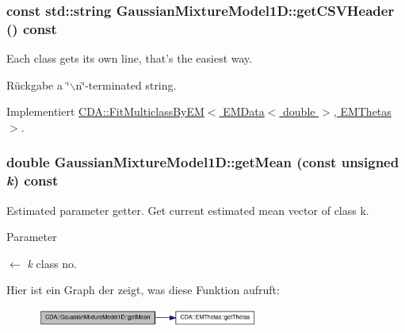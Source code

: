 \hypertarget{classCDA_1_1GaussianMixtureModel1D_adfb929641e967030e9b63c6e53ea64c0}{
\subsubsection[{getCSVHeader}]{\setlength{\rightskip}{0pt plus 5cm}const std::string GaussianMixtureModel1D::getCSVHeader () const}}
\label{classCDA_1_1GaussianMixtureModel1D_adfb929641e967030e9b63c6e53ea64c0}


Each class gets its own line, that's the easiest way. 

\begin{DoxyReturn}{Rückgabe}
a \char`\"{}$\backslash$n\char`\"{}-\/terminated string. 
\end{DoxyReturn}


Implementiert \hyperlink{classCDA_1_1FitMulticlassByEM_aec99fc55d806d855e02b9a2fc96887a0}{CDA::FitMulticlassByEM$<$ EMData$<$ double $>$, EMThetas $>$}.

\hypertarget{classCDA_1_1GaussianMixtureModel1D_abd992452517cd8f0efc8f5408f898e33}{
\subsubsection[{getMean}]{\setlength{\rightskip}{0pt plus 5cm}double GaussianMixtureModel1D::getMean (const unsigned {\em k}) const}}
\label{classCDA_1_1GaussianMixtureModel1D_abd992452517cd8f0efc8f5408f898e33}


Estimated parameter getter. Get current estimated mean vector of class k. 


\begin{DoxyParams}{Parameter}
\item[\mbox{$\leftarrow$} {\em k}]class no. \end{DoxyParams}


Hier ist ein Graph der zeigt, was diese Funktion aufruft:\nopagebreak
\begin{figure}[H]
\begin{center}
\leavevmode
\includegraphics[width=207pt]{classCDA_1_1GaussianMixtureModel1D_abd992452517cd8f0efc8f5408f898e33_cgraph}
\end{center}
\end{figure}




